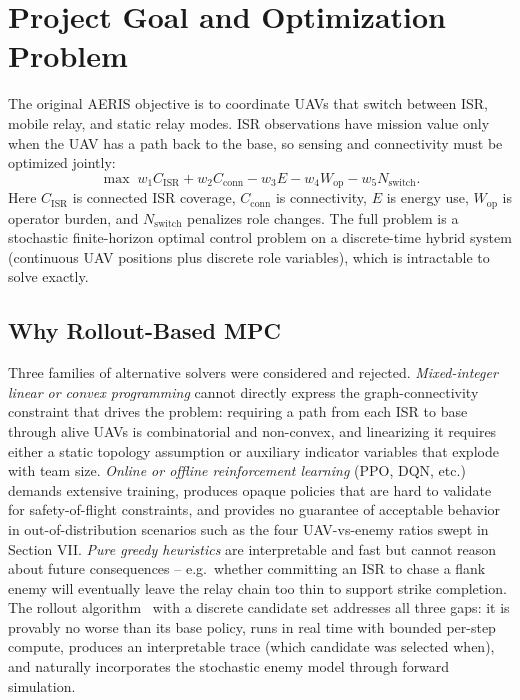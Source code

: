 \documentclass[conference]{IEEEtran}
\begin{document}
\section{Project Goal and Optimization Problem}
The original AERIS objective is to coordinate UAVs that switch between ISR,
mobile relay, and static relay modes. ISR observations have mission value only
when the UAV has a path back to the base, so sensing and connectivity must be
optimized jointly:
\begin{equation}
\max \; w_1 C_{\text{ISR}} + w_2 C_{\text{conn}}
- w_3 E - w_4 W_{\text{op}} - w_5 N_{\text{switch}}.
\label{eq:original_obj}
\end{equation}
Here $C_{\text{ISR}}$ is connected ISR coverage, $C_{\text{conn}}$ is
connectivity, $E$ is energy use, $W_{\text{op}}$ is operator burden, and
$N_{\text{switch}}$ penalizes role changes. The full problem is a stochastic
finite-horizon optimal control problem on a discrete-time hybrid system
(continuous UAV positions plus discrete role variables), which is intractable
to solve exactly.

\subsection{Why Rollout-Based MPC}
Three families of alternative solvers were considered and rejected.
\textit{Mixed-integer linear or convex programming} cannot directly express
the graph-connectivity constraint that drives the problem: requiring a path
from each ISR to base through alive UAVs is combinatorial and non-convex,
and linearizing it requires either a static topology assumption or
auxiliary indicator variables that explode with team size. \textit{Online
or offline reinforcement learning} (PPO, DQN, etc.) demands extensive
training, produces opaque policies that are hard to validate for safety-of-flight
constraints, and provides no guarantee of acceptable behavior in
out-of-distribution scenarios such as the four UAV-vs-enemy ratios swept
in Section VII. \textit{Pure greedy heuristics} are interpretable and
fast but cannot reason about future consequences -- e.g.\ whether
committing an ISR to chase a flank enemy will eventually leave the
relay chain too thin to support strike completion. The rollout
algorithm~\cite{bertsekas_rl_2019} with a discrete candidate set
addresses all three gaps: it is provably no worse than its base policy,
runs in real time with bounded per-step compute, produces an
interpretable trace (which candidate was selected when), and naturally
incorporates the stochastic enemy model through forward simulation.
\end{document}

